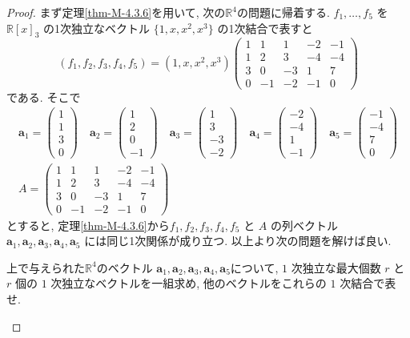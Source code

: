 \documentclass[dvipdfmx,a4paper,11pt]{article} %
\newcommand{\R}{\mathbb{R}}
\theoremstyle{definition}
\begin{document}
\begin{proof}
まず定理\ref{thm-M-4.3.6}を用いて, 次の$\R^4$の問題に帰着する. 
$f_1,\ldots,f_5$ を $\mathbb{R}[x]_3$ の1次独立なベクトル $\{1,x,x^2,x^3\}$ の1次結合で表すと
\[
(f_1,f_2,f_3,f_4,f_5)
=
(1,x,x^2,x^3)
\begin{pmatrix}
1&1&1&-2&-1\\
1&2&3&-4&-4\\
3&0&-3&1&7\\
0&-1&-2&-1&0
\end{pmatrix}
\]
である.
そこで
$$
\begin{gathered}
 \bm{a}_1=\begin{pmatrix}
1\\1\\3\\0
\end{pmatrix} \quad
 \bm{a}_2= \begin{pmatrix}
1\\2\\0\\-1
\end{pmatrix}\quad
 \bm{a}_3 =\begin{pmatrix}
1\\3\\-3\\-2
\end{pmatrix}\quad
 \bm{a}_4 =\begin{pmatrix}
-2\\-4\\1\\-1
\end{pmatrix}\quad
 \bm{a}_5=\begin{pmatrix}
-1\\-4\\7\\0
\end{pmatrix}\\
 A=\begin{pmatrix}
1&1&1&-2&-1\\
1&2&3&-4&-4\\
3&0&-3&1&7\\
0&-1&-2&-1&0
\end{pmatrix}
\end{gathered}
$$
とすると, 
定理\ref{thm-M-4.3.6}から$f_1,f_2,f_3,f_4,f_5$ と $A$ の列ベクトル $\bm{a}_1,\bm{a}_2,\bm{a}_3, \bm{a}_4, \bm{a}_5$ には同じ1次関係が成り立つ.
以上より次の問題を解けば良い.
\begin{tcolorbox}[mybox]
上で与えられた$\R^4$のベクトル $\bm{a}_1,\bm{a}_2,\bm{a}_3, \bm{a}_4, \bm{a}_5$について,  \(1\) 次独立な最大個数 \(r\) と \(r\) 個の \(1\) 次独立なベクトルを一組求め, 他のベクトルをこれらの \(1\) 次結合で表せ.

\end{tcolorbox}
\end{proof}
\end{document}
